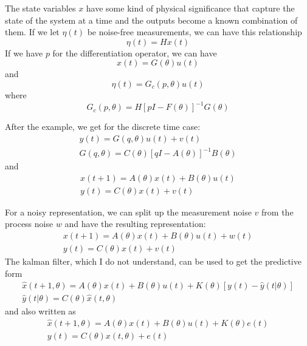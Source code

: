 The state variables $x$ have some kind of physical significance that capture the state of the system at a time and the outputs become a known combination of them.
If we let $\eta (t)$ be noise-free measurements, we can have this relationship
\begin{equation}
    \eta (t) = H x(t)
\end{equation}
If we have $p$ for the differentiation operator, we can have
\begin{equation}
    [pI - F(\theta)] x(t) = G(\theta) u(t)
\end{equation}
and
\begin{equation}
   \eta(t) = G_c(p,\theta) u(t)
\end{equation}
where
\begin{equation}
    G_c(p, \theta) = H[pI-F(\theta)]^{-1}G(\theta)
\end{equation}

After the example, we get for the discrete time case:
\begin{gather}
    y(t) = G(q,\theta)u(t) + v(t) \\
    G(q,\theta) = C(\theta) [qI - A(\theta)]^{-1} B(\theta)
\end{gather}
and
\begin{gather}
    x(t+1) = A(\theta)x(t) + B(\theta) u(t) \\
    y(t) = C(\theta) x(t) + v(t)
\end{gather}

For a noisy representation, we can split up the measurement noise $v$ from the process noise $w$ and have the resulting representation:
\begin{gather}
    x(t+1) = A(\theta) x(t) + B(\theta) u(t) + w(t) \\ 
    y(t) = C(\theta) x(t) + v(t)
\end{gather}
The kalman filter, which I do not understand, can be used to get the predictive form
\begin{gather}
    \hat{x}(t+1,\theta) = A(\theta) x(t) + B(\theta) u(t) + K(\theta) [y(t) - \hat{y}(t|\theta)] \\
    \hat{y}(t|\theta) = C(\theta) \hat{x}(t,\theta)
\end{gather}
and also written as
\begin{gather}
    \hat{x}(t+1, \theta) = A(\theta) x(t) + B(\theta) u(t) + K(\theta) e(t) \\
    y(t) = C(\theta) x(t,\theta) + e(t)
\end{gather}

